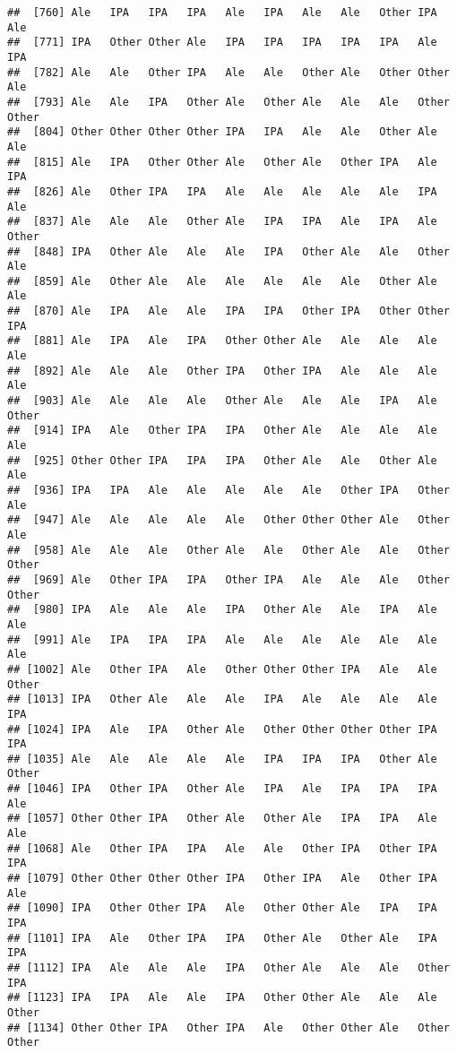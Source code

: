 \documentclass[]{article}
\begin{document}
\begin{verbatim}
##  [760] Ale   IPA   IPA   IPA   Ale   IPA   Ale   Ale   Other IPA   Ale  
##  [771] IPA   Other Other Ale   IPA   IPA   IPA   IPA   IPA   Ale   IPA  
##  [782] Ale   Ale   Other IPA   Ale   Ale   Other Ale   Other Other Ale  
##  [793] Ale   Ale   IPA   Other Ale   Other Ale   Ale   Ale   Other Other
##  [804] Other Other Other Other IPA   IPA   Ale   Ale   Other Ale   Ale  
##  [815] Ale   IPA   Other Other Ale   Other Ale   Other IPA   Ale   IPA  
##  [826] Ale   Other IPA   IPA   Ale   Ale   Ale   Ale   Ale   IPA   Ale  
##  [837] Ale   Ale   Ale   Other Ale   IPA   IPA   Ale   IPA   Ale   Other
##  [848] IPA   Other Ale   Ale   Ale   IPA   Other Ale   Ale   Other Ale  
##  [859] Ale   Other Ale   Ale   Ale   Ale   Ale   Ale   Other Ale   Ale  
##  [870] Ale   IPA   Ale   Ale   IPA   IPA   Other IPA   Other Other IPA  
##  [881] Ale   IPA   Ale   IPA   Other Other Ale   Ale   Ale   Ale   Ale  
##  [892] Ale   Ale   Ale   Other IPA   Other IPA   Ale   Ale   Ale   Ale  
##  [903] Ale   Ale   Ale   Ale   Other Ale   Ale   Ale   IPA   Ale   Other
##  [914] IPA   Ale   Other IPA   IPA   Other Ale   Ale   Ale   Ale   Ale  
##  [925] Other Other IPA   IPA   IPA   Other Ale   Ale   Other Ale   Ale  
##  [936] IPA   IPA   Ale   Ale   Ale   Ale   Ale   Other IPA   Other Ale  
##  [947] Ale   Ale   Ale   Ale   Ale   Other Other Other Ale   Other Ale  
##  [958] Ale   Ale   Ale   Other Ale   Ale   Other Ale   Ale   Other Other
##  [969] Ale   Other IPA   IPA   Other IPA   Ale   Ale   Ale   Other Other
##  [980] IPA   Ale   Ale   Ale   IPA   Other Ale   Ale   IPA   Ale   Ale  
##  [991] Ale   IPA   IPA   IPA   Ale   Ale   Ale   Ale   Ale   Ale   Ale  
## [1002] Ale   Other IPA   Ale   Other Other Other IPA   Ale   Ale   Other
## [1013] IPA   Other Ale   Ale   Ale   IPA   Ale   Ale   Ale   Ale   IPA  
## [1024] IPA   Ale   IPA   Other Ale   Other Other Other Other IPA   IPA  
## [1035] Ale   Ale   Ale   Ale   Ale   IPA   IPA   IPA   Other Ale   Other
## [1046] IPA   Other IPA   Other Ale   IPA   Ale   IPA   IPA   IPA   Ale  
## [1057] Other Other IPA   Other Ale   Other Ale   IPA   IPA   Ale   Ale  
## [1068] Ale   Other IPA   IPA   Ale   Ale   Other IPA   Other IPA   IPA  
## [1079] Other Other Other Other IPA   Other IPA   Ale   Other IPA   Ale  
## [1090] IPA   Other Other IPA   Ale   Other Other Ale   IPA   IPA   IPA  
## [1101] IPA   Ale   Other IPA   IPA   Other Ale   Other Ale   IPA   IPA  
## [1112] IPA   Ale   Ale   Ale   IPA   Other Ale   Ale   Ale   Other IPA  
## [1123] IPA   IPA   Ale   Ale   IPA   Other Other Ale   Ale   Ale   Other
## [1134] Other Other IPA   Other IPA   Ale   Other Other Ale   Other Other

\end{verbatim}
\end{document}
